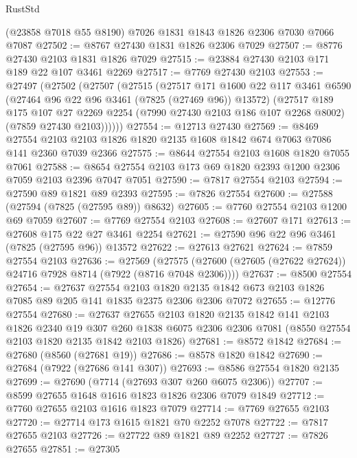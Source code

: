 \begin{lexlean}{RustStd}
\begin{coremodule}
    (@23858 @7018 @55 @8190)
    @7026
    @1831
    @1843
    @1826
    @2306
    @7030
    @7066
    @7087
@27502 := @8767 @27430 @1831 @1826 @2306 @7029
@27507 := @8776 @27430 @2103 @1831 @1826 @7029
@27515 := @23884 @27430 @2103 @171 @189 @22 @107 @3461 @2269
@27517 := @7769 @27430 @2103
@27553 := @27497
    (@27502
      (@27507
        (@27515
          (@27517
            @171
            @1600
            @22
            @117
            @3461
            @6590
            (@27464 @96 @22 @96 @3461 (@7825 (@27469 @96)) @13572)
            (@27517
              @189
              @175
              @107
              @27
              @2269
              @2254
              (@7990 @27430 @2103 @186 @107 @2268 @8002)
              (@7859 @27430 @2103))))))
@27554 := @12713 @27430
@27569 := @8469
    @27554
    @2103
    @2103
    @1826
    @1820
    @2135
    @1608
    @1842
    @674
    @7063
    @7086
    @141
    @2360
    @7039
    @2366
@27575 := @8644 @27554 @2103 @1608 @1820 @7055 @7061
@27588 := @8654 @27554 @2103 @173 @69 @1820 @2393 @1200 @2306 @7059 @2103 @2396 @7047 @7051
@27590 := @7817 @27554 @2103
@27594 := @27590 @89 @1821 @89 @2393
@27595 := @7826 @27554
@27600 := @27588 (@27594 (@7825 (@27595 @89)) @8632)
@27605 := @7760 @27554 @2103 @1200 @69 @7059
@27607 := @7769 @27554 @2103
@27608 := @27607 @171
@27613 := @27608 @175 @22 @27 @3461 @2254
@27621 := @27590 @96 @22 @96 @3461 (@7825 (@27595 @96)) @13572
@27622 := @27613 @27621
@27624 := @7859 @27554 @2103
@27636 := @27569
    (@27575 (@27600 (@27605 (@27622 @27624)) @24716 @7928 @8714 (@7922 (@8716 @7048 @2306))))
@27637 := @8500 @27554
@27654 := @27637
    @27554
    @2103
    @1820
    @2135
    @1842
    @673
    @2103
    @1826
    @7085
    @89
    @205
    @141
    @1835
    @2375
    @2306
    @2306
    @7072
@27655 := @12776 @27554
@27680 := @27637
    @27655
    @2103
    @1820
    @2135
    @1842
    @141
    @2103
    @1826
    @2340
    @19
    @307
    @260
    @1838
    @6075
    @2306
    @2306
    @7081
    (@8550 @27554 @2103 @1820 @2135 @1842 @2103 @1826)
@27681 := @8572 @1842
@27684 := @27680 (@8560 (@27681 @19))
@27686 := @8578 @1820 @1842
@27690 := @27684 (@7922 (@27686 @141 @307))
@27693 := @8586 @27554 @1820 @2135
@27699 := @27690 (@7714 (@27693 @307 @260 @6075 @2306))
@27707 := @8599 @27655 @1648 @1616 @1823 @1826 @2306 @7079 @1849
@27712 := @7760 @27655 @2103 @1616 @1823 @7079
@27714 := @7769 @27655 @2103
@27720 := @27714 @173 @1615 @1821 @70 @2252 @7078
@27722 := @7817 @27655 @2103
@27726 := @27722 @89 @1821 @89 @2252
@27727 := @7826 @27655
@27851 := @27305

\end{coremodule}
\end{lexlean}
